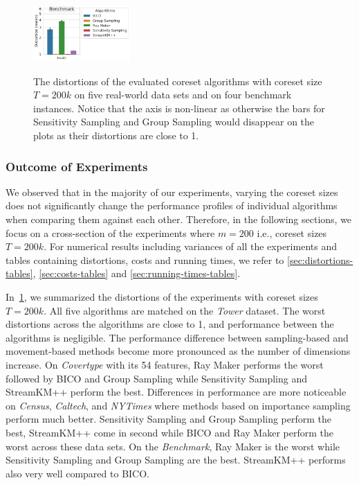\begin{figure}
{    \includegraphics[width=0.331\textwidth]{figures/distortions-mean-Benchmark-k40.pdf}
  }
  \caption{The distortions of the evaluated coreset algorithms with coreset size $T=200k$ on five real-world data sets and on four benchmark instances.  Notice that the axis is non-linear as otherwise the bars for Sensitivity Sampling and Group Sampling would disappear on the plots as their distortions are close to 1.}
  \label{fig:distortions}
\end{figure}







\subsubsection*{Outcome of Experiments}
We observed that in the majority of our experiments, varying the coreset sizes does not significantly change the performance profiles of individual algorithms when comparing them against each other. Therefore, in the following sections, we focus on a cross-section of the experiments where $m=200$ i.e., coreset sizes $T=200k$.
For numerical results including variances of all the experiments and tables containing distortions, costs and running times, we refer to \cref{sec:distortions-tables}, \cref{sec:costs-tables} and \cref{sec:running-times-tables}. 

In~\cref{fig:distortions}, we summarized the distortions of the experiments with coreset sizes $T=200k$. All five algorithms are matched on the \textit{Tower} dataset. The worst distortions across the algorithms are close to 1, and performance between the algorithms is negligible. The performance difference between sampling-based and movement-based methods become more pronounced as the number of dimensions increase. On \textit{Covertype} with its 54 features, Ray Maker performs the worst followed by BICO and Group Sampling while Sensitivity Sampling and StreamKM++ perform the best. Differences in performance are more noticeable on \textit{Census}, \textit{Caltech}, and \textit{NYTimes}  where methods based on importance sampling perform much better. Sensitivity Sampling and Group Sampling perform the best, StreamKM++ come in second while BICO and Ray Maker perform the worst across these data sets.
On the \textit{Benchmark}, Ray Maker is the worst while Sensitivity Sampling and Group Sampling are the best. StreamKM++ performs also very well compared to BICO.

